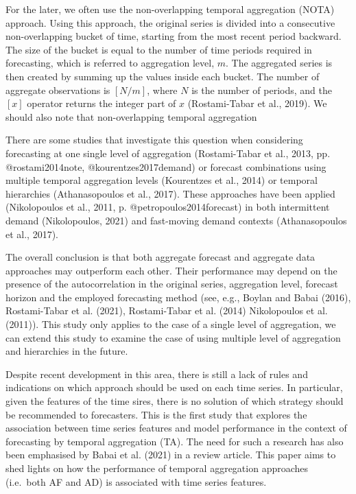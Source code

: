 \documentclass[]{elsarticle} %
\begin{document}
For the later, we often use the non-overlapping temporal aggregation
(NOTA) approach. Using this approach, the original series is divided
into a consecutive non-overlapping bucket of time, starting from the
most recent period backward. The size of the bucket is equal to the
number of time periods required in forecasting, which is referred to
aggregation level, \(m\). The aggregated series is then created by
summing up the values inside each bucket. The number of aggregate
observations is \([N/m]\), where \(N\) is the number of periods, and the
\([x]\) operator returns the integer part of \(x\) (Rostami-Tabar et
al., 2019). We should also note that non-overlapping temporal
aggregation

There are some studies that investigate this question when considering
forecasting at one single level of aggregation (Rostami-Tabar et al.,
2013, pp. @rostami2014note, @kourentzes2017demand) or forecast
combinations using multiple temporal aggregation levels (Kourentzes et
al., 2014) or temporal hierarchies (Athanasopoulos et al., 2017). These
approaches have been applied (Nikolopoulos et al., 2011, p.
@petropoulos2014forecast) in both intermittent demand (Nikolopoulos,
2021) and fast-moving demand contexts (Athanasopoulos et al., 2017).

The overall conclusion is that both aggregate forecast and aggregate
data approaches may outperform each other. Their performance may depend
on the presence of the autocorrelation in the original series,
aggregation level, forecast horizon and the employed forecasting method
(see, e.g., Boylan and Babai (2016), Rostami-Tabar et al. (2021),
Rostami-Tabar et al. (2014) Nikolopoulos et al. (2011)). This study only
applies to the case of a single level of aggregation, we can extend this
study to examine the case of using multiple level of aggregation and
hierarchies in the future.

Despite recent development in this area, there is still a lack of rules
and indications on which approach should be used on each time series. In
particular, given the features of the time sires, there is no solution
of which strategy should be recommended to forecasters. This is the
first study that explores the association between time series features
and model performance in the context of forecasting by temporal
aggregation (TA). The need for such a research has also been emphasised
by Babai et al. (2021) in a review article. This paper aims to shed
lights on how the performance of temporal aggregation approaches
(i.e.~both AF and AD) is associated with time series features.
\end{document}
